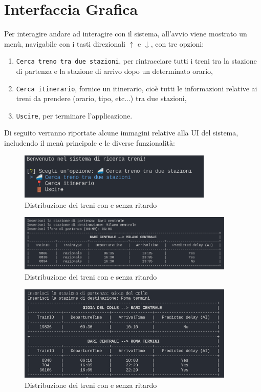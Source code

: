 \documentclass[italian,12pt,a4paper]{article}
\begin{document}
	\section{Interfaccia Grafica}
	Per interagire andare ad interagire con il sistema, all'avvio viene mostrato un menù, navigabile con i tasti direzionali $\uparrow$ e $\downarrow$, con tre opzioni:
	
		\begin{enumerate}
			\item \texttt{Cerca treno tra due stazioni}, per rintracciare tutti i treni tra la stazione di partenza e la stazione di arrivo dopo un determinato orario,
			\item \texttt{Cerca itinerario}, fornice un itinerario, cioè tutti le informazioni relative ai treni da prendere (orario, tipo, etc...) tra due stazioni,
			\item \texttt{Uscire}, per terminare l'applicazione.
		\end{enumerate} 
		Di seguito verranno riportate alcune immagini relative alla UI del sistema, includendo il menù principale e le diverse funzionalità:
		
		\begin{figure}[!h]
			\centering
			\includegraphics[width=350px]{img/main_menu}
			\caption{Distribuzione dei treni con e senza ritardo}
		\end{figure}

		\begin{figure}[!h]
			\centering
			\includegraphics[width=390px]{img/search_train}
			\caption{Distribuzione dei treni con e senza ritardo}
		\end{figure}

		\begin{figure}[!h]
			\centering
			\includegraphics[width=390px]{img/search_itin}
			\caption{Distribuzione dei treni con e senza ritardo}
		\end{figure}
	
\end{document}
